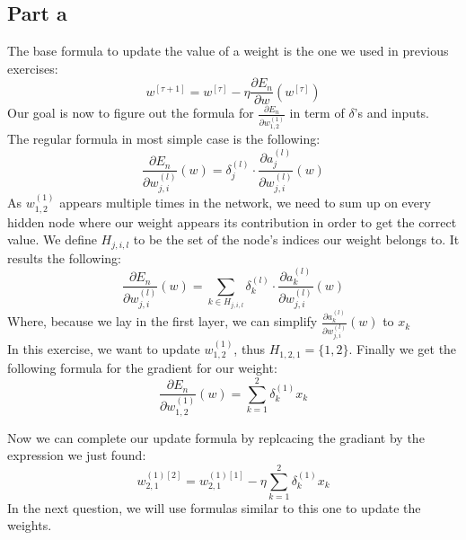 \documentclass[a4paper, 10pt]{article}
\begin{document}
\subsection{Part a}
The base formula to update the value of a weight is the one we used in previous exercises:
$$
w^{[\tau +1]} = w^{[\tau]} - \eta \frac{\partial E_n}{\partial w}(w^{[\tau]})
$$
Our goal is now to figure out the formula for $\frac{\partial E_n}{\partial w_{1,2}^{(1)}}$ in term of $\delta$'s and inputs.
\\
The regular formula in most simple case is the following:
$$
\frac{\partial E_n}{\partial w_{j,i}^{(l)}}(w) = \delta_j^{(l)} \cdot \frac{\partial a_j^{(l)}}{\partial w_{j,i}^{(l)}}(w) 
$$
As $w_{1,2}^{(1)}$ appears multiple times in the network, we need to sum up on every hidden node where our weight appears its contribution in order to get the correct value.
We define $H_{j,i,l}$ to be the set of the node's indices our weight belongs to. It results the following:
$$
\frac{\partial E_n}{\partial w_{j,i}^{(l)}}(w) = \sum_{k\in H_{j,i,l}} \delta_k^{(l)} \cdot \frac{\partial a_k^{(l)}}{\partial w_{j,i}^{(l)}}(w) 
$$
Where, because we lay in the first layer, we can simplify $\frac{\partial a_k^{(l)}}{\partial w_{j,i}^{(l)}}(w)$ to $x_k$
\\
In this exercise, we want to update $w_{1,2}^{(1)}$, thus $H_{1,2,1} = \{1,2\}$.
Finally we get the following formula for the gradient for our weight:
$$
\frac{\partial E_n}{\partial w_{1,2}^{(1)}}(w) = \sum_{k=1}^2 \delta_k^{(1)}x_k 
$$

Now we can complete our update formula by replcacing the gradiant by the expression we just found:
$$
w_{2,1}^{(1)[2]} = w_{2,1}^{(1)[1]} - \eta \sum_{k=1}^2 \delta_k^{(1)}x_k
$$
In the next question, we will use formulas similar to this one to update the weights.
\end{document}
